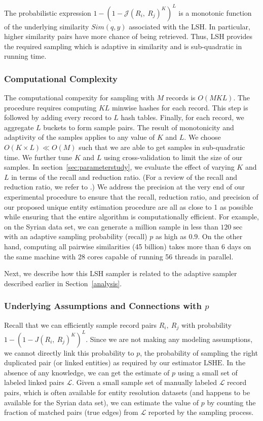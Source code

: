 \documentclass[aoas]{imsart}
\begin{document}
The probabilistic expression $1 - (1-\mathcal{J}(R_i,\ R_j)^K)^L$ is a monotonic function of the underlying similarity $Sim(q,y)$ associated with the LSH. In particular, higher similarity pairs have more chance of being retrieved. Thus, LSH provides the required sampling which is adaptive in similarity and is sub-quadratic in running time.

\subsubsection{Computational Complexity}
\label{sec:CC}
The computational compexity for sampling with $M$ records is $O(MKL)$. The procedure requires computing $KL$ minwise hashes for each record. This step is followed by adding every record to $L$ hash tables.  Finally, for each record, we aggregate $L$ buckets to form sample pairs. The result of monotonicity and adaptivity of the samples applies to any value of $K$ and $L$. We choose $O(K \times L) \ll O(M)$ such that we are able to get samples in sub-quadratic time. We further tune $K$ and $L$ using cross-validation to limit the size of our samples. In section~\ref{sec:parameterstudy}, we evaluate the effect of varying $K$ and $L$ in terms of the recall and reduction ratio. (For a review of the recall and reduction ratio, we refer to \cite{christen_2012}.) We address the precision at the very end of our experimental procedure to ensure that the recall, reduction ratio, and precision of our proposed unique entity estimation procedure are all as close to 1 as possible while ensuring that the entire algorithm is computationally efficient. For example, on the Syrian data set, we can generate a million sample in less than $120 \sec$ with an adaptive sampling probability (recall) $p$ as high as $0.9$.  On the other hand, computing all pairwise similarities (45 billion) takes more than 6 days on the same machine with 28 cores capable of running 56 threads in parallel.

Next, we describe how this LSH sampler is related to the adaptive sampler described earlier in  Section~\ref{analysis}.


\subsubsection{Underlying Assumptions and Connections with $p$}
Recall that we can efficiently sample record pairs $R_i, \ R_j$ with probability $1-(1-J(R_i,\ R_j)^K)^L.$
Since we are not making any modeling assumptions, we cannot directly link this probability to $p$, the probability of sampling the right duplicated pair (or linked entities) as required by our estimator $\text{LSHE}$. In the absence of any knowledge, we can get the estimate of $p$ using a small set of labeled linked pairs $\mathcal{L}$. Given a small sample set of manually labeled $\mathcal{L}$ record pairs, which is often available for entity resolution datasets (and happens to be available for the Syrian data set), we can estimate the value of $p$ by counting the fraction of matched pairs (true edges) from $\mathcal{L}$ reported by the sampling process.
\end{document}
